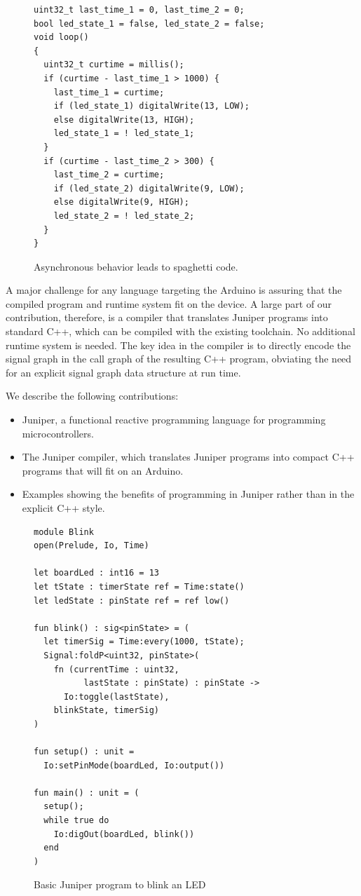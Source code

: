 \documentclass{sigplanconf}
\begin{document}
\begin{figure}[htb]
\begin{small}
\begin{verbatim}
uint32_t last_time_1 = 0, last_time_2 = 0;
bool led_state_1 = false, led_state_2 = false;
void loop()
{
  uint32_t curtime = millis();
  if (curtime - last_time_1 > 1000) {
    last_time_1 = curtime;
    if (led_state_1) digitalWrite(13, LOW);
    else digitalWrite(13, HIGH);
    led_state_1 = ! led_state_1;
  }
  if (curtime - last_time_2 > 300) {
    last_time_2 = curtime;
    if (led_state_2) digitalWrite(9, LOW);
    else digitalWrite(9, HIGH);
    led_state_2 = ! led_state_2;
  }
}
\end{verbatim}
\end{small}
\caption{Asynchronous behavior leads to spaghetti code.}
\label{fig:twolights}
\end{figure}

A major challenge for any language targeting the Arduino is assuring that the compiled program and runtime system fit on the device. A large part of our contribution, therefore, is a compiler that translates Juniper programs into standard C++, which can be compiled with the existing toolchain. No additional runtime system is needed. The key idea in the compiler is to directly encode the signal graph in the call graph of the resulting C++ program, obviating the need for an explicit signal graph data structure at run time.

We describe the following contributions:

\begin{itemize}
\item Juniper, a functional reactive programming language for programming microcontrollers.
\item The Juniper compiler, which translates Juniper programs into compact C++ programs that will fit on an Arduino.
\item Examples showing the benefits of programming in Juniper rather than in the explicit C++ style.
\end{itemize}

\begin{figure}
\label{fig:helloworldjuniper}
\begin{verbatim}
module Blink
open(Prelude, Io, Time)

let boardLed : int16 = 13
let tState : timerState ref = Time:state()
let ledState : pinState ref = ref low()

fun blink() : sig<pinState> = (
  let timerSig = Time:every(1000, tState);
  Signal:foldP<uint32, pinState>(
    fn (currentTime : uint32,
          lastState : pinState) : pinState ->
      Io:toggle(lastState),
    blinkState, timerSig)
)

fun setup() : unit =
  Io:setPinMode(boardLed, Io:output())

fun main() : unit = (
  setup();
  while true do
    Io:digOut(boardLed, blink())
  end
)
\end{verbatim}
\caption{Basic Juniper program to blink an LED}
\label{fig:blinkjuniper}
\end{figure}
\end{document}
